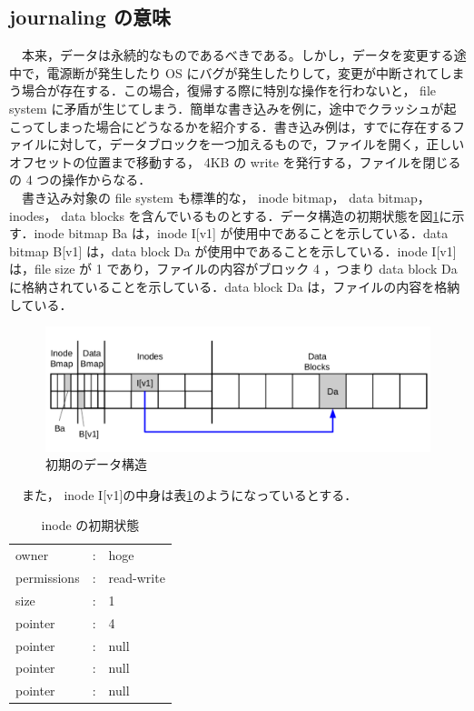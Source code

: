 \documentclass[graduation-thesis]{jsarticle}
\begin{document}
\subsection{journaling の意味}
　本来，データは永続的なものであるべきである。しかし，データを変更する途中で，電源断が発生したり OS にバグが発生したりして，変更が中断されてしまう場合が存在する．この場合，復帰する際に特別な操作を行わないと， file system に矛盾が生じてしまう．簡単な書き込みを例に，途中でクラッシュが起こってしまった場合にどうなるかを紹介する．書き込み例は，すでに存在するファイルに対して，データブロックを一つ加えるもので，ファイルを開く，正しいオフセットの位置まで移動する， 4KB の write を発行する，ファイルを閉じるの 4 つの操作からなる．\\
　書き込み対象の file system も標準的な， inode bitmap， data bitmap， inodes， data blocks を含んでいるものとする．データ構造の初期状態を図\ref{fig:data1}に示す．inode bitmap Ba は，inode I[v1] が使用中であることを示している．data bitmap B[v1] は，data block Da が使用中であることを示している．inode I[v1] は，file size が 1 であり，ファイルの内容がブロック 4 ，つまり data block Da に格納されていることを示している．data block Da は，ファイルの内容を格納している．\\
\begin{figure}[H]
	\begin{center}
		\includegraphics[width=15.0cm,clip]{images/data1.pdf}
		\caption{初期のデータ構造}
		\label{fig:data1}
	\end{center}
\end{figure}
　また， inode I[v1]の中身は表\ref{tab:inode1}のようになっているとする．\\
\begin{table}[h]
	\begin{center}
	\caption{inode の初期状態}
		\begin{tabular}{lcl}
			owner & : & hoge \\
			permissions & : & read-write \\
			size & : & 1 \\
			pointer & : & 4 \\
			pointer & : & null \\
			pointer & : & null \\
			pointer & : & null
		\end{tabular}
		\label{tab:inode1}
	\end{center}
\end{table}
\end{document}
